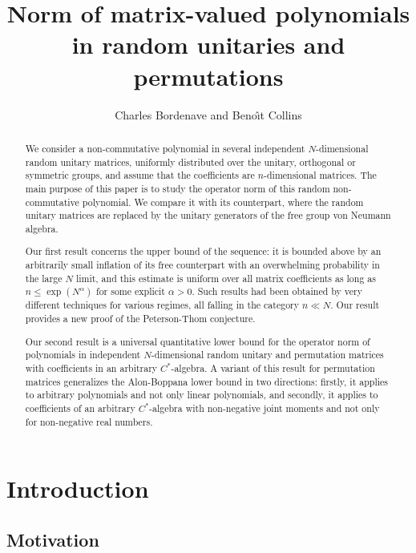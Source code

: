 \documentclass[11pt]{article}
\newcommand{\1}{1\!\!{\sf I}}
\begin{document}
\title{Norm of matrix-valued polynomials in random unitaries and permutations}
\author{Charles Bordenave and Beno\^\i{}t Collins}


\maketitle


\begin{abstract}
We consider a non-commutative polynomial in several independent $N$-dimensional random unitary matrices, uniformly distributed over the unitary, orthogonal or symmetric groups, and assume that the coefficients are $n$-dimensional matrices. 
The main purpose of this paper is to study the operator norm of this random non-commutative polynomial. We compare it with its counterpart, where the random unitary matrices are replaced by the unitary generators of the free group von Neumann algebra. 

Our first result concerns the upper bound of the sequence: it is bounded above by an arbitrarily small inflation of its free counterpart with an overwhelming probability 
 in the large $N$ limit, and this estimate is uniform over all matrix coefficients as long as $n \le\exp (N^\alpha)$ for
some explicit $\alpha >0$. 
Such results had been obtained by very different techniques for various regimes, all falling in the category $n\ll N$. Our result provides a new proof of the Peterson-Thom conjecture.


Our second result is a universal quantitative lower bound for the operator norm of polynomials in independent $N$-dimensional random unitary and permutation matrices with coefficients in an arbitrary $C^*$-algebra. A variant of this result for permutation matrices generalizes the Alon-Boppana lower bound in two directions: firstly, it applies to arbitrary polynomials and not only linear polynomials, and secondly, it applies to coefficients of an arbitrary $C^*$-algebra with non-negative joint moments and not only for non-negative real numbers. 

\end{abstract}

\section{Introduction}

\subsection{Motivation}
\label{subsec:motiv}
\end{document}
